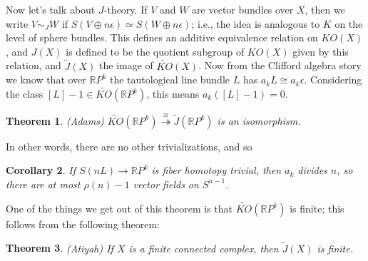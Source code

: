 \documentclass{article}
\newcommand{\R}{\mathbb{R}}
\newcommand{\RP}{\R P}
\newcommand{\onto}{\twoheadrightarrow}
\newtheorem{thm}{Theorem}[section]
\newtheorem{cor}[thm]{Corollary}
\begin{document}
Now let's talk about $J$-theory.  If $V$ and $W$ are vector bundles over $X$, then we write $V \sim_J W$ if $S(V \oplus n \epsilon) \simeq S(W \oplus n \epsilon)$; i.e., the idea is analogous to $K$ on the level of sphere bundles.  This defines an additive equivalence relation on $KO(X)$, and $J(X)$ is defined to be the quotient subgroup of $KO(X)$ given by this relation, and $\tilde J(X)$ the image of $\widetilde{KO}(X)$. %
Now from the Clifford algebra story we know that over $\RP^k$ the tautological line bundle $L$ has $a_k L \cong a_k \epsilon$. %
Considering the class $[L] - 1 \in \widetilde{KO}(\RP^k)$, this means $a_k([L] - 1) = 0$. %
\begin{thm}(Adams)
$\widetilde{KO}(\RP^k) \stackrel{\cong}{\onto} \tilde J(\RP^k)$ is an isomorphism.
\end{thm}
In other words, there are no other trivializations, and so %
\begin{cor}
If $S(nL) \to \RP^k$ is fiber homotopy trivial, then $a_k$ divides $n$, so there are at most $\rho(n) - 1$ vector fields on $S^{n-1}$. %
\end{cor}
One of the things we get out of this theorem is that $\widetilde{KO}(\RP^k)$ is finite; this follows from the following theorem: %
\begin{thm}(Atiyah)
If $X$ is a finite connected complex, then $\tilde J(X)$ is finite.
\end{thm}
\end{document}
